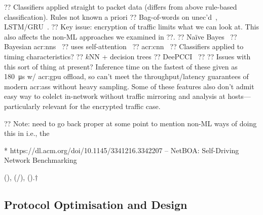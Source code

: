 ?? Classifiers applied straight to packet data (differs from above rule-based classification). Rules not known a priori
?? Bag-of-words on unec'd~\parencite{DBLP:journals/ton/YunW0Z16}, LSTM/GRU~\parencite{DBLP:conf/iwqos/LiXNZX18}.
?? Key issue: encryption of traffic limits what we can look at. This also affects the non-ML approaches we examined in ??.
?? Na\"{i}ve Bayes~\parencite{DBLP:conf/sigmetrics/MooreZ05}
?? Bayesian \glspl{acr:nn}~\parencite{DBLP:journals/tnn/AuldMG07}
?? \parencite{DBLP:conf/sigcomm/Xie0JDSLSX20} uses self-attention~\parencite{DBLP:conf/nips/VaswaniSPUJGKP17}
?? \gls{acr:cnn}~\parencite{DBLP:journals/soco/LotfollahiSZS20}
?? Classifiers applied to timing characteristics?
?? $k$NN + decision trees \parencite{DBLP:conf/icissp/Draper-GilLMG16}
?? DeePCCI~\parencite{DBLP:conf/sigcomm/SanderRHW19}
?? \parencite{DBLP:journals/tnsm/AcetoCMP19}
?? Issues with this sort of thing at present? Inference time on the fastest of these given as \qty{180}{\micro\second} w/ \gls{acr:gpu} offload, so can't meet the throughput/latency guarantees of modern \glspl{acr:as} without heavy sampling. Some of these features also don't admit easy way to colelct in-network without traffic mirroring and analysis at hosts---particularly relevant for the encrypted traffic case.

?? Note: need to go back proper at some point to mention non-ML ways of doing this in i.e., the 

* https://dl.acm.org/doi/10.1145/3341216.3342207 -- NetBOA: Self-Driving Network Benchmarking

(\rllitstate), (\rllitact/\rllitactreal), (\rllitreward).$\dagger$

\subsection{Protocol Optimisation and Design}

